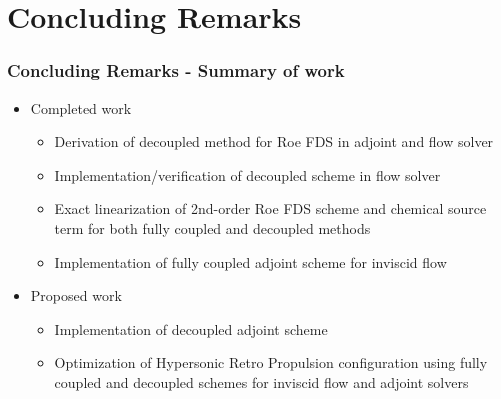 \documentclass{beamer}
\begin{document}
\section{Concluding Remarks}
\begin{frame}
  \frametitle{Concluding Remarks - Summary of work}
  \begin{itemize}
    \item {}Completed work
      \begin{itemize}
        \item Derivation of decoupled method for Roe FDS in adjoint and flow solver
        \item Implementation/verification of decoupled scheme in flow solver
        \item Exact linearization of 2nd-order Roe FDS scheme and chemical
          source term for both fully coupled and decoupled methods
        \item Implementation of fully coupled adjoint scheme for inviscid flow
      \end{itemize}
    \item {}Proposed work
      \begin{itemize}
        \item Implementation of decoupled adjoint scheme
        \item Optimization of Hypersonic Retro Propulsion configuration
          using fully coupled and decoupled schemes for inviscid flow and
          adjoint solvers
      \end{itemize}
  \end{itemize}
\end{frame}
\end{document}
